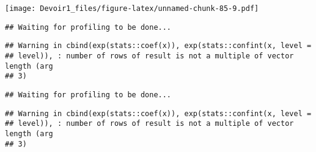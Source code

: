 \documentclass[]{article}
\newenvironment{Shaded}{\begin{snugshade}}{\end{snugshade}}
\newcommand{\KeywordTok}[1]{\textcolor[rgb]{0.13,0.29,0.53}{\textbf{#1}}}
\newcommand{\DataTypeTok}[1]{\textcolor[rgb]{0.13,0.29,0.53}{#1}}
\newcommand{\DecValTok}[1]{\textcolor[rgb]{0.00,0.00,0.81}{#1}}
\newcommand{\StringTok}[1]{\textcolor[rgb]{0.31,0.60,0.02}{#1}}
\newcommand{\OperatorTok}[1]{\textcolor[rgb]{0.81,0.36,0.00}{\textbf{#1}}}
\newcommand{\NormalTok}[1]{#1}
\begin{document}
\texttt{[image: Devoir1\_files/figure-latex/unnamed-chunk-85-9.pdf]}

\begin{Shaded}
\end{Shaded}

\begin{verbatim}
## Waiting for profiling to be done...
\end{verbatim}

\begin{verbatim}
## Warning in cbind(exp(stats::coef(x)), exp(stats::confint(x, level =
## level)), : number of rows of result is not a multiple of vector length (arg
## 3)
\end{verbatim}

\begin{verbatim}
## Waiting for profiling to be done...
\end{verbatim}

\begin{verbatim}
## Warning in cbind(exp(stats::coef(x)), exp(stats::confint(x, level =
## level)), : number of rows of result is not a multiple of vector length (arg
## 3)
\end{verbatim}
\end{document}
